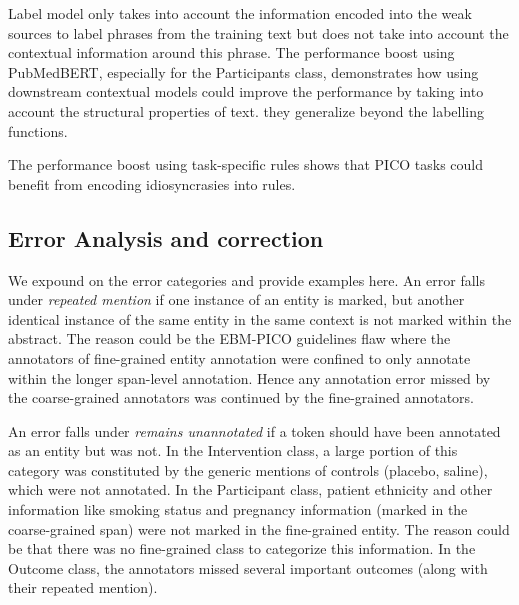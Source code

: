 \documentclass[10.7pt,]{article}
\begin{document}
Label model only takes into account the information encoded into the weak sources to label phrases from the training text but does not take into account the contextual information around this phrase.
The performance boost using PubMedBERT, especially for the Participants class, demonstrates how using downstream contextual models could improve the performance by taking into account the structural properties of text.
they generalize beyond the labelling functions.

The performance boost using task-specific rules shows that PICO tasks could benefit from encoding idiosyncrasies into rules.

%
%
%
\subsection{Error Analysis and correction}\label{err_ana}
%
We expound on the error categories and provide examples here.
An error falls under \textit{repeated mention} if one instance of an entity is marked, but another identical instance of the same entity in the same context is not marked within the abstract. 
The reason could be the EBM-PICO guidelines flaw where the annotators of fine-grained entity annotation were confined to only annotate within the longer span-level annotation.
Hence any annotation error missed by the coarse-grained annotators was continued by the fine-grained annotators.

An error falls under \textit{remains unannotated} if a token should have been annotated as an entity but was not.
In the Intervention class, a large portion of this category was constituted by the generic mentions of controls (placebo, saline), which were not annotated.
In the Participant class, patient ethnicity and other information like smoking status and pregnancy information (marked in the coarse-grained span) were not marked in the fine-grained entity.
The reason could be that there was no fine-grained class to categorize this information. 
In the Outcome class, the annotators missed several important outcomes (along with their repeated mention).
\end{document}

